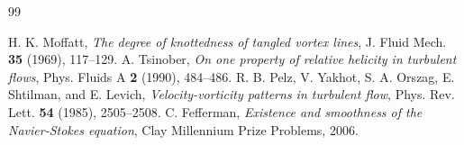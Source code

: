 \documentclass[11pt,a4paper]{article}
\theoremstyle{definition}
\begin{document}
\begin{thebibliography}{99}

 H. K. Moffatt, \emph{The degree of knottedness of tangled vortex lines}, J. Fluid Mech. \textbf{35} (1969), 117--129.
 A. Tsinober, \emph{On one property of relative helicity in turbulent flows}, Phys. Fluids A \textbf{2} (1990), 484--486.
 R. B. Pelz, V. Yakhot, S. A. Orszag, E. Shtilman, and E. Levich, \emph{Velocity-vorticity patterns in turbulent flow}, Phys. Rev. Lett. \textbf{54} (1985), 2505--2508.
 C. Fefferman, \emph{Existence and smoothness of the Navier-Stokes equation}, Clay Millennium Prize Problems, 2006.

\end{thebibliography}
\end{document}
